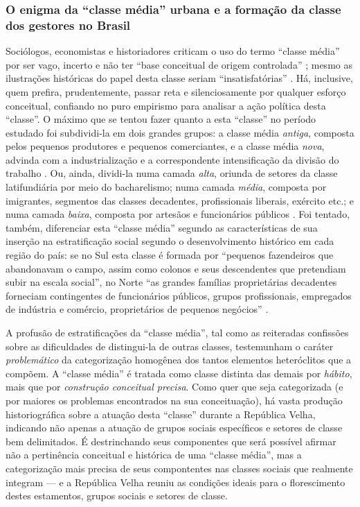 \subsubsection{O enigma da ``classe média'' urbana e a formação da classe dos gestores no Brasil}\label{subsubsec:clamed}

Sociólogos, economistas e historiadores criticam o uso do termo ``classe média'' por ser vago, incerto e não ter ``base conceitual de origem controlada'' \cite[p.~19]{POCHMANN2014};  mesmo as ilustrações históricas do papel desta classe seriam ``insatisfatórias'' \cite[p.~9]{pinheiro_clamed_1977}. Há, inclusive, quem prefira, prudentemente, passar reta e silenciosamente por qualquer esforço conceitual, confiando no puro empirismo para analisar a ação política desta ``classe''. O máximo que se tentou fazer quanto a esta ``classe'' no período estudado foi subdividi-la em dois grandes grupos: a classe média \textit{antiga}, composta pelos pequenos produtores e pequenos comerciantes, e a classe média \textit{nova}, advinda com a industrialização e a correspondente intensificação da divisão do trabalho \cite[p.~11]{pinheiro_clamed_1977}. Ou, ainda, dividi-la numa camada \textit{alta}, oriunda de setores da classe latifundiária por meio do bacharelismo; numa camada \textit{média}, composta por imigrantes, segmentos das classes decadentes, profissionais liberais, exército etc.; e numa camada \textit{baixa}, composta por artesãos e funcionários públicos \cite[p. ~175-176]{CARONE1970inst}. Foi tentado, também, diferenciar esta ``classe média'' segundo as características de sua inserção na estratificação social segundo o desenvolvimento histórico em cada região do país: se no Sul esta classe é formada por ``pequenos fazendeiros que abandonavam o campo, assim como colonos e seus descendentes que pretendiam subir na escala social'', no Norte ``as grandes famílias proprietárias decadentes forneciam contingentes de funcionários públicos, grupos profissionais, empregados de indústria e comércio, proprietários de pequenos negócios''  \cite[p.~16]{pinheiro_clamed_1977}.

A profusão de estratificações da ``classe média'', tal como as reiteradas confissões sobre as dificuldades de distingui-la de outras classes, testemunham o caráter \textit{problemático} da categorização homogênea dos tantos elementos heteróclitos que a compõem. A ``classe média'' é tratada como classe distinta das demais por \textit{hábito}, mais que por \textit{construção conceitual precisa}. Como quer que seja categorizada (e por maiores os problemas encontrados na sua conceituação), há vasta produção historiográfica sobre a atuação desta ``classe'' durante a República Velha, indicando não apenas a atuação de grupos sociais específicos e setores de classe bem delimitados. É destrinchando seus componentes que será possível afirmar não a pertinência conceitual e histórica de uma ``classe média'', mas a categorização mais precisa de seus compontentes nas classes sociais que realmente integram --- e a República Velha reuniu as condições ideais para o florescimento destes estamentos, grupos sociais e setores de classe. 

